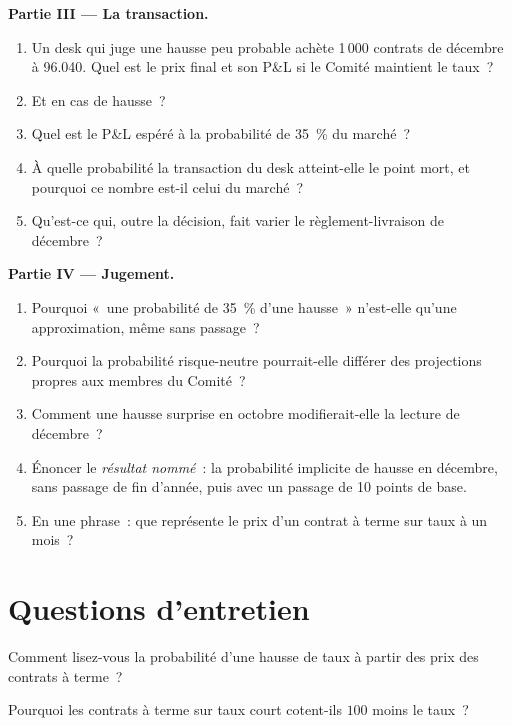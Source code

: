 \begin{problem}
\medskip\noindent\textbf{Partie III --- La transaction.}
\begin{enumerate}[resume]
\item Un desk qui juge une hausse peu probable achète 1\,000 contrats de décembre à
96.040. Quel est le prix final et son P\&L si le Comité maintient le taux~?
\item Et en cas de hausse~?
\item Quel est le P\&L espéré à la probabilité de 35~\% du marché~?
\item À quelle probabilité la transaction du desk atteint-elle le point mort, et pourquoi ce nombre est-il celui
du marché~?
\item Qu'est-ce qui, outre la décision, fait varier le règlement-livraison de décembre~?
\end{enumerate}

\medskip\noindent\textbf{Partie IV --- Jugement.}
\begin{enumerate}[resume]
\item Pourquoi «~une probabilité de 35~\% d'une hausse~» n'est-elle qu'une approximation, même sans passage~?
\item Pourquoi la probabilité risque-neutre pourrait-elle différer des projections
propres aux membres du Comité~?
\item Comment une hausse surprise en octobre modifierait-elle la lecture de décembre~?
\item Énoncer le \emph{résultat nommé}~: la probabilité implicite de hausse en décembre,
sans passage de fin d'année, puis avec un passage de 10 points de base.
\item En une phrase~: que représente le prix d'un contrat à terme sur taux à un mois~?
\end{enumerate}
\end{problem}

\section{Questions d'entretien}

\begin{interviewq}\label{iq:m2:short-term-interest-rate-futures:1}
Comment lisez-vous la probabilité d'une hausse de taux à partir des prix des contrats à terme~?
\end{interviewq}

\begin{interviewq}\label{iq:m2:short-term-interest-rate-futures:2}
Pourquoi les contrats à terme sur taux court cotent-ils $100$ moins le taux~?
\end{interviewq}


